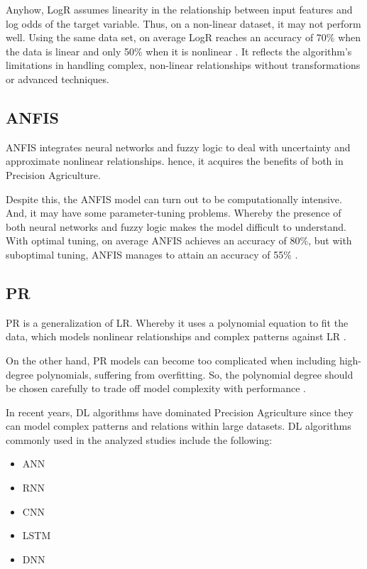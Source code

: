 \documentclass[conference]{IEEEtran}
\begin{document}
Anyhow, LogR assumes linearity in the relationship between input features and log odds of the target variable. Thus, on a non-linear dataset, it may not perform well. Using the same data set, on average LogR reaches an accuracy of 70\% when the data is linear and only 50\% when it is nonlinear \cite{b29}. It reflects the algorithm's limitations in handling complex, non-linear relationships without transformations or advanced techniques.

\subsection{ANFIS}\label{AA}
ANFIS integrates neural networks and fuzzy logic to deal with uncertainty and approximate nonlinear relationships. hence, it acquires the benefits of both in Precision Agriculture. 

Despite this, the ANFIS model can turn out to be computationally intensive. And, it may have some parameter-tuning problems. Whereby the presence of both neural networks and fuzzy logic makes the model difficult to understand. With optimal tuning, on average ANFIS achieves an accuracy of 80\%, but with suboptimal tuning, ANFIS manages to attain an accuracy of 55\% \cite{b30}.

\subsection{PR}\label{AA}
PR is a generalization of LR. Whereby it uses a polynomial equation to fit the data, which models nonlinear relationships and complex patterns against LR \cite{b31}. 

On the other hand, PR models can become too complicated when including high-degree polynomials, suffering from overfitting. So, the polynomial degree should be chosen carefully to trade off model complexity with performance \cite{b32}. 

In recent years, DL algorithms have dominated Precision Agriculture since they can model complex patterns and relations within large datasets. DL algorithms commonly used in the analyzed studies include the following:

\begin{itemize}
\item ANN
\item RNN
\item CNN
\item LSTM
\item DNN
\end{itemize}
\end{document}
